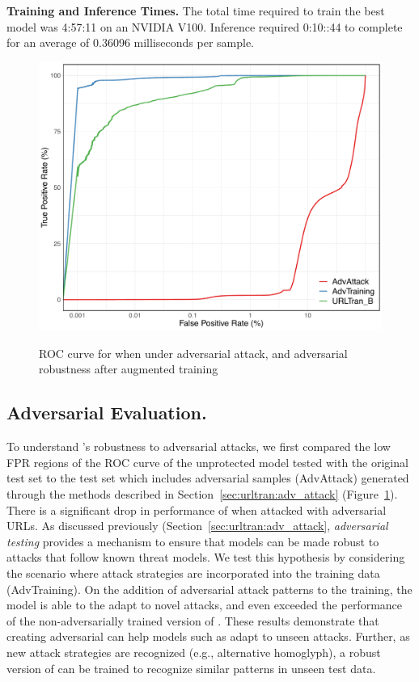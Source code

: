 %

\noindent\textbf{Training and Inference Times.}
The total time required to train the best \URLTranSysb model was 4:57:11 on an NVIDIA V100. Inference
required 0:10::44 to complete for an average of 0.36096 milliseconds per sample.


\begin{figure}
    \centering
	\includegraphics[width=0.7\linewidth,alt={ROC curve under adversarial attack and robustness after training with augmented data.}]{urltran/figures/log_roc_adv_R.png}
	\caption{ROC curve for \URLTranSysb when under adversarial attack, and adversarial robustness after augmented training}
	\label{fig:urltran:adversarial_roc}
\end{figure} 

\subsection{Adversarial Evaluation.}
To understand \URLTranSys's robustness to adversarial attacks, we first compared the low FPR regions of the ROC curve of the unprotected model tested with the original test set to the
test set which includes adversarial samples (AdvAttack) generated through the methods described in Section~\ref{sec:urltran:adv_attack} (Figure~\ref{fig:urltran:adversarial_roc}).
There is a significant drop in performance of \URLTranSysb when attacked with adversarial URLs.
As discussed previously (Section~\ref{sec:urltran:adv_attack}, \textit{adversarial testing} provides a mechanism to ensure that models can be made robust to attacks that follow known threat models.
We test this hypothesis by considering the scenario where attack strategies are incorporated into the training data (AdvTraining).
On the addition of adversarial attack patterns to the training, the model is able to  the adapt to novel attacks, and even exceeded the performance of the non-adversarially trained version of \URLTranSys.
These results demonstrate that  creating adversarial can help models such as \URLTranSys adapt to unseen attacks.
Further, as new attack strategies are recognized (e.g., alternative homoglyph), a robust version of \URLTranSys can be trained to recognize similar patterns in unseen test data.

